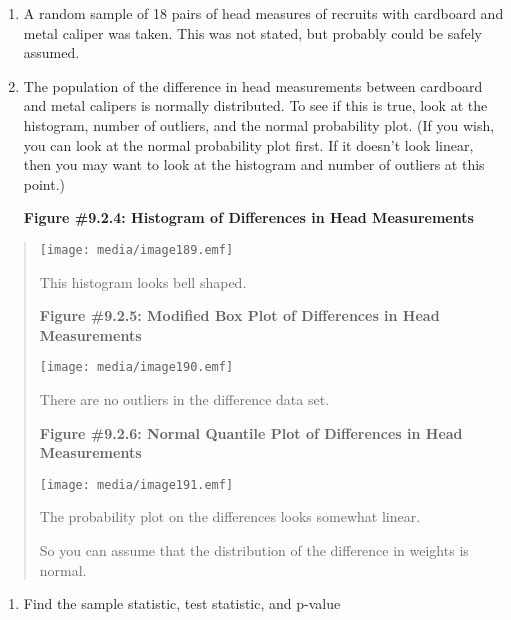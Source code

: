 \documentclass[]{book}
\providecommand{\tightlist}{%
  \setlength{\itemsep}{0pt}\setlength{\parskip}{0pt}}
\begin{document}
\begin{enumerate}
\def\labelenumi{\alph{enumi}.}
\item
  A random sample of 18 pairs of head measures of recruits with cardboard and metal caliper was taken. This was not stated, but probably could be safely assumed.
\item
  The population of the difference in head measurements between cardboard and metal calipers is normally distributed. To see if this is true, look at the histogram, number of outliers, and the normal probability plot. (If you wish, you can look at the normal probability plot first. If it doesn't look linear, then you may want to look at the histogram and number of outliers at this point.)

  \textbf{Figure \#9.2.4: Histogram of Differences in Head Measurements}
\end{enumerate}

\begin{quote}
\texttt{[image: media/image189.emf]}

This histogram looks bell shaped.

\textbf{Figure \#9.2.5: Modified Box Plot of Differences in Head
Measurements}

\texttt{[image: media/image190.emf]}

There are no outliers in the difference data set.

\textbf{Figure \#9.2.6: Normal Quantile Plot of Differences in Head
Measurements}

\texttt{[image: media/image191.emf]}

The probability plot on the differences looks somewhat linear.

So you can assume that the distribution of the difference in weights is normal.
\end{quote}

\begin{enumerate}
\def\labelenumi{\arabic{enumi}.}
\setcounter{enumi}{3}
\tightlist
\item
  Find the sample statistic, test statistic, and p-value
\end{enumerate}
\end{document}
